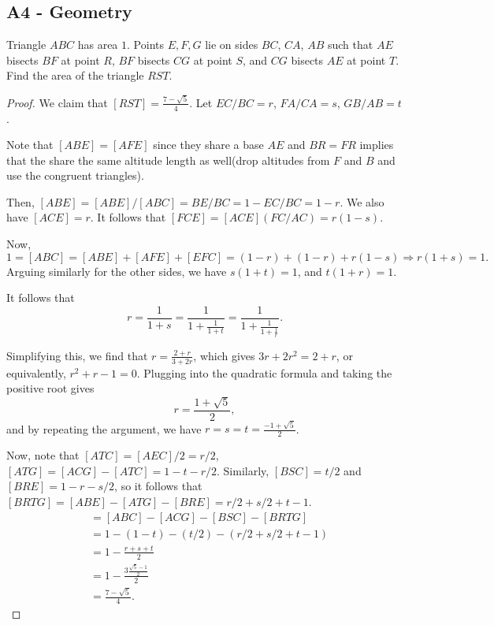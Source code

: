 \documentclass[11pt]{scrartcl}
\begin{document}
\subsection{A4 - Geometry}
\begin{Prob} Triangle $ABC$ has area $1$.  Points $E, F, G$ lie on sides $BC$, $CA$, $AB$ such that $AE$ bisects $BF$ at point $R$, $BF$ bisects $CG$ at point $S$, and $CG$ bisects $AE$ at point $T$.  Find the area of the triangle $RST$.
\end{Prob}
\begin{proof}
We claim that $[RST] = \frac{7- \sqrt{5}}{4}.$
Let $EC/BC = r$, $FA/CA = s$, $GB/AB = t$.

Note that $[ABE] = [AFE]$ since they share a base $AE$ and $BR = FR$ implies that the share the same altitude length as well(drop altitudes from $F$ and $B$ and use the congruent triangles).  

Then, $[ABE] = [ABE]/[ABC]= BE/BC = 1 - EC/BC = 1-r$.  We also have $[ACE] = r$.  It follows that $[FCE] = [ACE] (FC/AC) = r(1-s)$.

Now,
$$1 = [ABC] = [ABE] + [AFE] + [EFC] = (1-r) + (1-r) + r(1-s) \Longrightarrow r(1+s) = 1.$$
Arguing similarly for the other sides, we have $s(1+t) = 1$, and $t(1+r) = 1$.  

It follows that 
$$r = \frac{1}{1+s} = \frac{1}{1 + \frac{1}{1+t}} = \frac{1}{1 + \frac{1}{1 + \frac{1}{r}}}.$$

Simplifying this, we find that $r = \frac{2+r}{3 + 2r}$, which gives $3r + 2r^2 = 2+ r$, or equivalently, $r^2 + r - 1 = 0$.  Plugging into the quadratic formula and taking the positive root gives
$$r =\frac{1 + \sqrt{5}}{2},$$
and by repeating the argument, we have $r = s = t = \frac{-1 + \sqrt{5}}{2}$.  

Now, note that $[ATC] = [AEC] / 2 = r/2$, $[ATG] = [ACG] - [ATC] = 1 - t - r/2$.  Similarly, $[BSC] = t/2$ and $[BRE] = 1 - r - s/2$, so it follows that $[BRTG] = [ABE] - [ATG] - [BRE] = r/2 + s/2 + t - 1$.
\begin{align*}
[RST] &= [ABC] - [ACG] - [BSC] - [BRTG] \\
&= 1 - (1 - t) - (t/2) - (r/2 + s/2 + t - 1)\\
&= 1 - \frac{r + s + t}{2} \\
&= 1 - \frac{3\frac{\sqrt{5} - 1}{2}}{2} \\
&= \frac{7 - \sqrt{5}}{4}.
\end{align*}
\end{proof}
\end{document}
